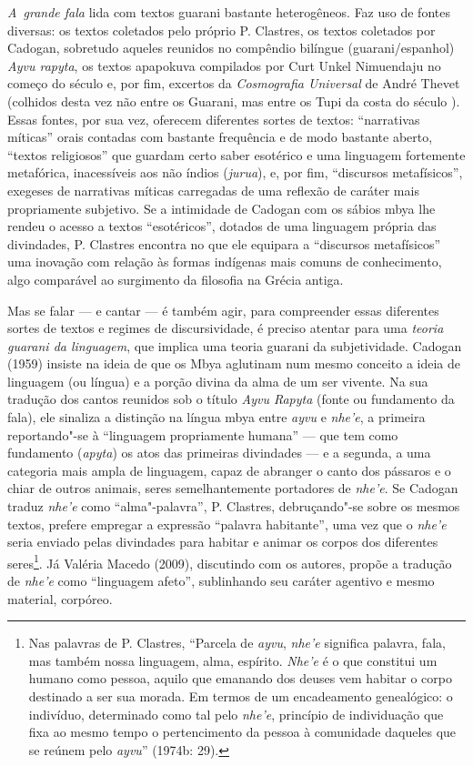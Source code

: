\emph{A~grande fala} lida com textos guarani bastante heterogêneos. Faz uso de
fontes diversas: os textos coletados pelo próprio P. Clastres, os
textos coletados por Cadogan, sobretudo aqueles reunidos no compêndio
bilíngue (guarani/espanhol) \emph{Ayvu rapyta}, os textos apapokuva compilados
por Curt Unkel Nimuendaju no começo do século  e, por fim, excertos
da \emph{Cosmografia Universal} de André Thevet (colhidos desta vez não entre
os Guarani, mas entre os Tupi da costa do século ). Essas fontes,
por sua vez, oferecem diferentes sortes de textos: ``narrativas míticas''
orais contadas com bastante frequência e de modo bastante aberto,
``textos religiosos'' que guardam certo saber esotérico e uma linguagem
fortemente metafórica, inacessíveis aos não índios (\emph{jurua}), e, por fim,
``discursos metafísicos'', exegeses de narrativas míticas carregadas de
uma reflexão de caráter mais propriamente subjetivo. Se a intimidade de
Cadogan com os sábios mbya lhe rendeu o acesso a textos ``esotéricos'',
dotados de uma linguagem própria das divindades, P. Clastres encontra
no que ele equipara a ``discursos metafísicos'' uma inovação com relação
às formas indígenas mais comuns de conhecimento, algo comparável ao
surgimento da filosofia na Grécia antiga.

Mas se falar --- e cantar --- é também agir, para compreender essas
diferentes sortes de textos e regimes de discursividade, é preciso
atentar para uma \emph{teoria guarani da linguagem}, que implica uma teoria
guarani da subjetividade. Cadogan (1959) insiste na ideia de que os
Mbya aglutinam num mesmo conceito a ideia de linguagem (ou língua) e a
porção divina da alma de um ser vivente. Na sua tradução dos cantos
reunidos sob o título \emph{Ayvu Rapyta} (fonte ou fundamento da fala), ele
sinaliza a distinção na língua mbya entre \emph{ayvu} e \emph{nhe’e}, a primeira
reportando"-se à ``linguagem propriamente humana'' --- que tem como
fundamento (\emph{apyta}) os atos das primeiras divindades --- e a segunda, a
uma categoria mais ampla de linguagem, capaz de abranger o canto dos
pássaros e o chiar de outros animais, seres semelhantemente portadores
de \emph{nhe’e}. Se Cadogan traduz \emph{nhe’e} como ``alma"-palavra'', P. Clastres,
debruçando"-se sobre os mesmos textos, prefere empregar a expressão
``palavra habitante'', uma vez que o \emph{nhe’e} seria enviado pelas divindades
para habitar e animar os corpos dos diferentes seres\footnote{Nas
palavras de P. Clastres, ``Parcela de \emph{ayvu}, \emph{nhe’e} significa palavra,
fala, mas também nossa linguagem, alma, espírito. \emph{Nhe’e} é o que
constitui um humano como pessoa, aquilo que emanando dos deuses vem
habitar o corpo destinado a ser sua morada. Em termos de um
encadeamento genealógico: o indivíduo, determinado como tal pelo \emph{nhe’e},
princípio de individuação que fixa ao mesmo tempo o pertencimento da
pessoa à comunidade daqueles que se reúnem pelo \emph{ayvu}'' (1974b: 29).}. Já
Valéria Macedo (2009), discutindo com os autores, propõe a tradução de
\emph{nhe’e} como ``linguagem afeto'', sublinhando seu caráter agentivo e mesmo
material, corpóreo. 

